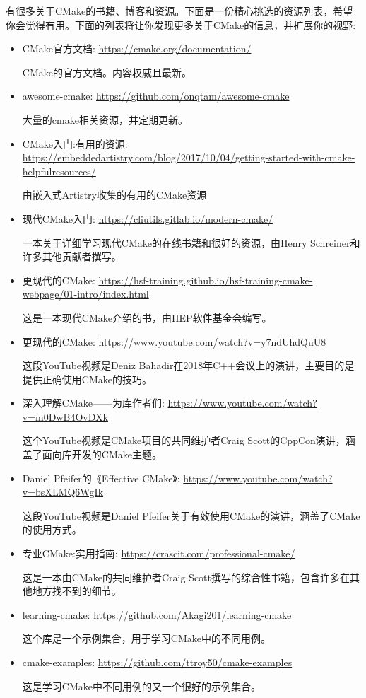 有很多关于CMake的书籍、博客和资源。下面是一份精心挑选的资源列表，希望你会觉得有用。下面的列表将让你发现更多关于CMake的信息，并扩展你的视野:

\begin{itemize}
\item 
CMake官方文档: \url{https://cmake.org/documentation/}

CMake的官方文档。内容权威且最新。
	
\item 
awesome-cmake: \url{https://github.com/onqtam/awesome-cmake}

大量的cmake相关资源，并定期更新。

\item 
CMake入门:有用的资源: \url{https://embeddedartistry.com/blog/2017/10/04/getting-started-with-cmake-helpfulresources/}

由嵌入式Artistry收集的有用的CMake资源

\item 
现代CMake入门: \url{https://cliutils.gitlab.io/modern-cmake/}

一本关于详细学习现代CMake的在线书籍和很好的资源，由Henry Schreiner和许多其他贡献者撰写。

\item 
更现代的CMake: \url{https://hsf-training.github.io/hsf-training-cmake-webpage/01-intro/index.html}

这是一本现代CMake介绍的书，由HEP软件基金会编写。

\item 
更现代的CMake: \url{https://www.youtube.com/watch?v=y7ndUhdQuU8}

这段YouTube视频是Deniz Bahadir在2018年C++会议上的演讲，主要目的是提供正确使用CMake的技巧。

\item 
深入理解CMake——为库作者们: \url{https://www.youtube.com/watch?v=m0DwB4OvDXk}

这个YouTube视频是CMake项目的共同维护者Craig Scott的CppCon演讲，涵盖了面向库开发的CMake主题。

\item 
Daniel Pfeifer的《Effective CMake》: \url{https://www.youtube.com/watch?v=bsXLMQ6WgIk}

这段YouTube视频是Daniel Pfeifer关于有效使用CMake的演讲，涵盖了CMake的使用方式。

\item 
专业CMake:实用指南: \url{https://crascit.com/professional-cmake/}

这是一本由CMake的共同维护者Craig Scott撰写的综合性书籍，包含许多在其他地方找不到的细节。

\item 
learning-cmake: \url{https://github.com/Akagi201/learning-cmake}

这个库是一个示例集合，用于学习CMake中的不同用例。

\item 
cmake-examples: \url{https://github.com/ttroy50/cmake-examples}

这是学习CMake中不同用例的又一个很好的示例集合。
\end{itemize}

